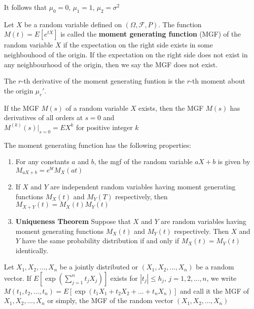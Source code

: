 It follows that $\mu_0 = 0$, $\mu_1 = 1$, $\mu_2 = \sigma ^2$

\begin{defn}
    Let $X$ be a random variable defined on $\left (\Omega,  \mathcal{F}, P\right )$. The function $M\left (t\right ) = E\left [e ^{t X}\right ]$ is called the \textbf{moment generating function} (MGF) of the random variable $X$ if the expectation on the right side exists in some neighbouhood of the origin. If the expectation on the right side does not exist in any neighbourhood of the origin, then we say the MGF does not exist.
\end{defn}

\begin{samepage}
The $r$-th derivative of the moment generating funtion is the $r$-th moment about the origin $\mu_r '$.
\begin{thm}
    If the MGF $M(s)$ of a random variable $X$ exists, then the MGF $M(s)$ has derivatives of all orders at $s=0$ and \\

    $M^{(k)} (s) |_{s=0} = EX^k$ for positive integer $k$
\end{thm}

\end{samepage}
\begin{thm}
    The moment generating function has the following properties:
    \begin{enumerate}
        \item For any constants $a$ and $b$, the mgf of the random variable $a X + b$ is given by $M_{aX+b} = e^{bt} M_X(at)$
        \item If $X$ and $Y$ are independent random variables having moment generating functions $M_X(t)$ and $M_Y(T)$ respectively, then $M_{X+Y}(t) = M_X(t) M_Y(t)$
        \item \textbf{Uniqueness Theorem} Suppose that $X$ and $Y$ are random variables having moment generating functions $M_X(t)$ and $M_Y(t)$ respectively. Then $X$ and $Y$ have the same probability distribution if and only if $M_X(t) = M_Y(t)$ identically.
    \end{enumerate}
\end{thm}

\begin{defn}
    Let $X_1, X_2, ..., X_n$ be a jointly distributed or $(X_1, X_2, ..., X_n)$ be a random vector. If $E[\exp ( \sum_{j=1}^n t_j X_j )]$ exists for $|t_j| \leq h_j$, $j = 1, 2, ...,n$, we write $M(t_1, t_2, ..., t_n) = E[\exp(t_1 X_1 + t_2 X_2 + ... + t_n X_n)]$ and call it the MGF of $X_1, X_2, ..., X_n$ or simply, the MGF of the random vector $(X_1, X_2, ..., X_n)$
\end{defn}

